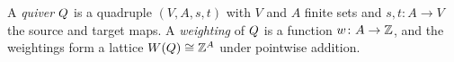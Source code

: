 \begin{definition}[Quiver]\label{sh-0002}
A \emph{quiver} $Q$ is a quadruple $(V, A, s, t)$ with $V$ and $A$ finite sets and $s, t \colon A \to V$ the source and target maps. A \emph{weighting} of $Q$ is a function $w \colon A \to \mathbb{Z}$, and the weightings form a lattice $W(Q) \cong \mathbb{Z}^{A}$ under pointwise addition.
\end{definition}
